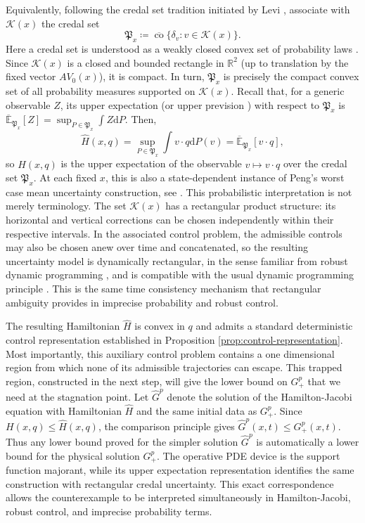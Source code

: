 \documentclass[11pt,reqno,noamsfonts]{amsart}
\theoremstyle{definition}
\theoremstyle{remark}
\begin{document}
Equivalently, following the credal set tradition initiated by Levi
\cite{Levi1980}, associate with $\mathcal K(x)$ the credal set
\[
  \mathfrak P_x
  \coloneqq 
  \overline{\operatorname{co}}
  \{\delta_v:v\in\mathcal K(x)\}.
\]
Here a credal set is understood as a weakly closed convex set of
probability laws
\cite{AugustinEtAl2014,TroffaesDeCooman2014}.
Since $\mathcal K(x)$ is a closed and bounded rectangle in $\mathbb R^2$
(up to translation by the fixed vector $A V_0(x)$), it is compact. In turn, $\mathfrak P_x$ is precisely the
compact convex set of all probability measures supported on
$\mathcal K(x)$. Recall that, for a generic observable $Z$, its upper expectation (or upper prevision \cite{AugustinEtAl2014,Walley1991}) with respect to $\mathfrak P_x$ is $\overline{\mathbb E}_{\mathfrak P_x}[Z]=\sup_{P \in \mathfrak P_x} \int Z \mathrm d P$. Then,
\[
  \widehat H(x,q)
  =
  \sup_{P\in\mathfrak P_x}
  \int v\cdot q \mathrm d P(v) = \overline{\mathbb E}_{\mathfrak P_x}[v\cdot q],
\]
so $\widehat H(x,q)$ is the upper expectation of the observable
$v\mapsto v\cdot q$ over the credal set $\mathfrak P_x$. 
At each fixed $x$, this is also a state-dependent instance of Peng's
worst case mean uncertainty construction, see
. This probabilistic interpretation is not merely terminology. The set $\mathcal K(x)$ has a rectangular product structure: its
horizontal and vertical corrections can be chosen independently within
their respective intervals.  In the associated control problem, the admissible controls may also be
chosen anew over time and concatenated, so the resulting uncertainty
model is dynamically rectangular, in the sense familiar from robust
dynamic programming \cite{Iyengar2005}, and is compatible with the usual
dynamic programming principle
\cite[Chapter~III, Section~3.1]{BardiCapuzzoDolcetta1997}.  This is the
same time consistency mechanism that rectangular ambiguity provides in
imprecise probability and robust control.

The resulting Hamiltonian $\widehat H$ is convex in $q$ and admits a
standard deterministic control representation established in
Proposition \ref{prop:control-representation}.  Most importantly, this
auxiliary control problem contains a one dimensional region from which
none of its admissible trajectories can escape.  This trapped region,
constructed in the next step, will give the lower bound on $G_+^p$ that
we need at the stagnation point.
Let $\widehat G^p$ denote the solution of the Hamilton-Jacobi equation
with Hamiltonian $\widehat H$ and the same initial data as $G_+^p$.
Since
  $H(x,q)\le \widehat H(x,q)$,
the comparison principle gives
  $\widehat G^p(x,t)\le G_+^p(x,t)$.
Thus any lower bound proved for the simpler solution $\widehat G^p$ is
automatically a lower bound for the physical solution $G_+^p$. The operative PDE device is the support function majorant, while its
upper expectation representation identifies the same construction with
rectangular credal uncertainty. This exact correspondence allows the
counterexample to be interpreted simultaneously in Hamilton-Jacobi,
robust control, and imprecise probability terms.
\end{document}
